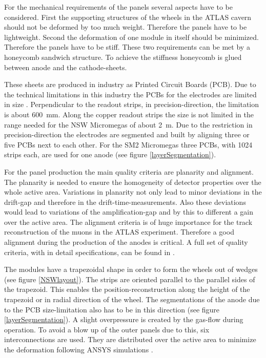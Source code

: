 \documentclass[
twoside,            %
BCOR1.4cm,          %
10pt,               %
headings=normal,    %
headsepline,        %
clearplainpage,		%
final,              %
div=14,
open=right,
bibliography=toc
]{scrreprt}
\begin{document}
For the mechanical requirements of the panels several aspects have to be considered.
First the supporting structures of the wheels in the ATLAS cavern should not be deformed by too much weight.
Therefore the panels have to be lightweight.
Second the deformation of one module in itself should be minimized.
Therefore the panels have to be stiff.
These two requirements can be met by a honeycomb sandwich structure.
To achieve the stiffness honeycomb is glued between anode and the cathode-sheets.

These sheets are produced in industry as Printed Circuit Boards (PCB).
Due to the technical limitations in this industry the PCBs for the electrodes are limited in size \cite[p.50]{NSW_TDR}.
Perpendicular to the readout strips, in precision-direction, the limitation is about \SI{600}{mm}.
Along the copper readout strips the size is not limited in the range needed for the NSW Micromegas of about \SI{2}{m}.
Due to the restriction in precision-direction the electrodes are segmented and built by aligning three or five PCBs next to each other.
For the SM2 Micromegas three PCBs, with 1024 strips each, are used for one anode (see figure \ref{layerSegmentation}).

For the panel production the main quality criteria are planarity and alignment.
The planarity is needed to ensure the homogeneity of detector properties over the whole active area.
Variations in planarity not only lead to minor deviations in the drift-gap and therefore in the drift-time-measurements.
Also these deviations would lead to variations of the amplification-gap and by this to different a gain over the active area. 
The alignment criteria is of huge importance for the track reconstruction of the muons in the ATLAS experiment.
Therefore a good alignment during the production of the anodes is critical.
A full set of quality criteria, with in detail specifications, can be found in \cite{NSWmicromegas}.

The modules have a trapezoidal shape in order to form the wheels out of wedges (see figure \ref{NSWlayout}).
The strips are oriented parallel to the parallel sides of the trapezoid.
This enables the position-reconstruction along the height of the trapezoid or in radial direction of the wheel.
The segmentations of the anode due to the PCB size-limitation also has to be in this direction (see figure \ref{layerSegmentation}).
A slight overpressure is created by the gas-flow during operation.
To avoid a blow up of the outer panels due to this, six interconnections are used.
They are distributed over the active area to minimize the deformation following ANSYS simulations \cite{ansys}.
\end{document}
